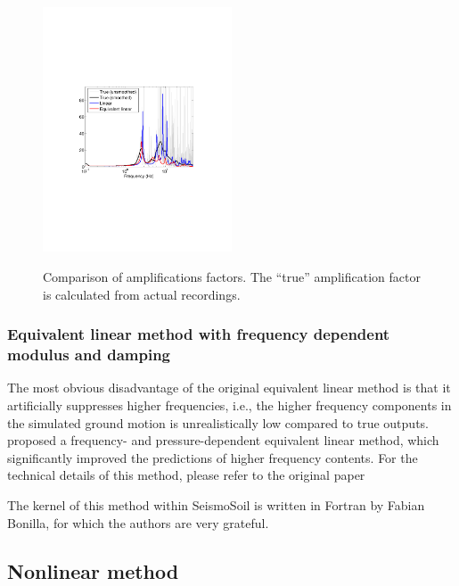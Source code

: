\documentclass[11pt,letterpaper]{article}
\begin{document}
\begin{figure}[h]
    \centering
  \includegraphics[width=0.5\textwidth]{amplification_factor_comparison.pdf}\\
  \caption{Comparison of amplifications factors. The ``true'' amplification factor is calculated from actual recordings.}\label{fig:af_comparison}
\end{figure}




\subsubsection{Equivalent linear method with frequency dependent modulus and damping}

The most obvious disadvantage of the original equivalent linear method is that it artificially suppresses higher frequencies, i.e., the higher frequency components in the simulated ground motion is unrealistically low compared to true outputs. \cite{Assimaki_Kausel_2002} proposed a frequency- and pressure-dependent equivalent linear method, which significantly improved the predictions of higher frequency contents. For the technical details of this method, please refer to the original paper

The kernel of this method within SeismoSoil is written in Fortran by Fabian Bonilla, for which the authors are very grateful.

\subsection{Nonlinear method}\label{sec:nonlinear}
\end{document}
